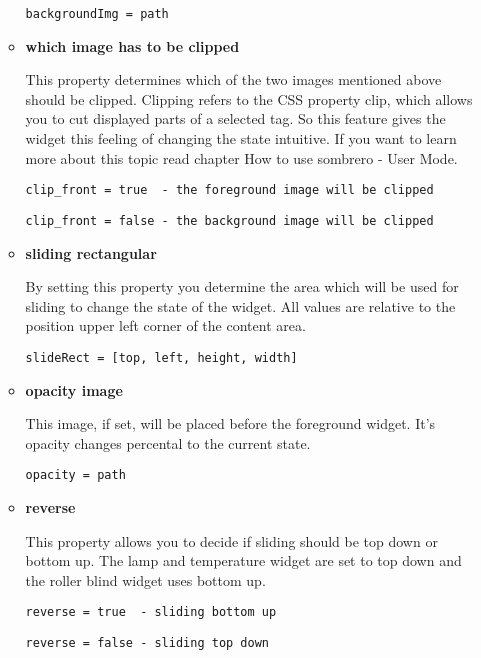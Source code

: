 \begin{itemize}
\begin{itemize}
                \lstinline!backgroundImg = path!
            \item \textbf{which image has to be clipped}


                This property determines which of the two images mentioned above should be clipped. Clipping refers to the CSS property clip, which allows you to cut displayed parts of a selected tag. So this feature gives the widget this feeling of changing the state intuitive. If you want to learn more about this topic read chapter How to use sombrero - User Mode.

                \lstinline!clip_front = true  - the foreground image will be clipped!

                \lstinline!clip_front = false - the background image will be clipped!
            \item \textbf{sliding rectangular}


                By setting this property you determine the area which will be used for sliding to change the state of the widget. All values are relative to the position upper left corner of the content area.

                \lstinline!slideRect = [top, left, height, width]!
            \item \textbf{opacity image}


                This image, if set, will be placed before the foreground widget. It's opacity changes percental to the current state.

                \lstinline!opacity = path!
            \item \textbf{reverse}


                This property allows you to decide if sliding should be top down or bottom up. The lamp and temperature widget are set to top down and the roller blind widget uses bottom up.

                \lstinline!reverse = true  - sliding bottom up!

                \lstinline!reverse = false - sliding top down!
        \end{itemize}


\end{itemize}
